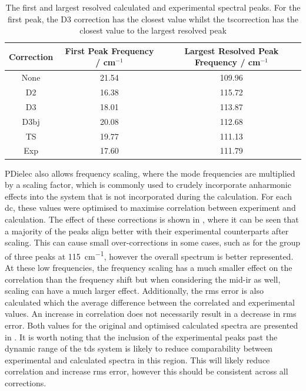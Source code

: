 \begin{table}
\centering
\begin{tabular}{@{}ccc@{}}
\toprule
Correction            & First Peak Frequency / cm${^{-1}}$           & Largest Resolved Peak Frequency / cm${^{-1}}$      \\ \midrule
None &
  21.54 &
  109.96 \\
D2 &
  16.38 &
  115.72 \\
D3 &
 18.01 & 
 113.87 \\
D3\acrshort{bj} &
  20.08 &
  112.68 \\
TS &
  19.77 &
  111.13 \\
Exp &
  17.60 &
  111.79 \\ \bottomrule
\end{tabular}
\captionsetup{font = footnotesize, justification = centering}
\caption[The First and Largest Resolved Calculated and Experimental Spectral Peaks]{The first and largest resolved calculated and experimental spectral peaks. For the first peak, the D3 correction has the closest value whilst the \acrshort{ts}correction has the closest value to the largest resolved peak}
\label{tab:calc_exp_peaks}
\end{table}

PDielec also allows frequency scaling, where the mode frequencies are multiplied by a scaling factor, which is commonly used to crudely incorporate anharmonic effects into the system that is not incorporated during the calculation. For each \acrshort{dc}, these values were optimised to maximise correlation between experiment and calculation. The effect of these corrections is shown in , where it can be seen that a majority of the peaks align better with their experimental counterparts after scaling. This can cause small over\nobreakdash-corrections in some cases, such as for the group of three peaks at \SI{115}{cm^{-1}}, however the overall spectrum is better represented. At these low frequencies, the frequency scaling has a much smaller effect on the correlation than the frequency shift but when considering the mid\nobreakdash-\acrshort{ir} as well, scaling can have a much larger effect. Additionally, the \acrfull{rms} error is also calculated which the average difference between the correlated and experimental values. An increase in correlation does not necessarily result in a decrease in \acrshort{rms} error. Both values for the original and optimised calculated spectra are presented in . It is worth noting that the inclusion of the experimental peaks past the dynamic range of the \acrshort{tds} system is likely to reduce comparability between experimental and calculated spectra in this region. This will likely reduce correlation and increase \acrshort{rms} error, however this should be consistent across all corrections.

